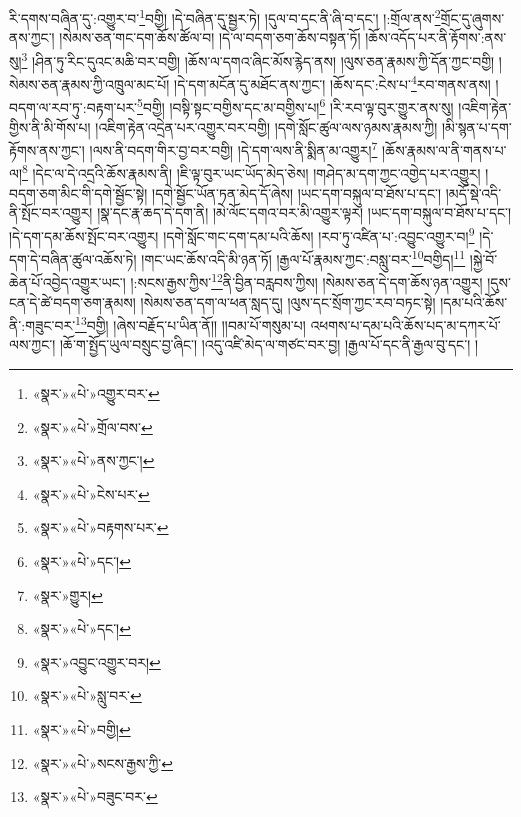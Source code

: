 རི་དགས་བཞིན་དུ་:འགྱུར་བ་\footnote{«སྣར་»«པེ་»འགྱུར་བར་}བགྱི། །དེ་བཞིན་དུ་སྦྱར་ཏེ། །དུལ་བ་དང་ནི་ཞི་བ་དང་། །:གྲོལ་ནས་\footnote{«སྣར་»«པེ་»གྲོལ་བས་}གྲོང་དུ་ཞུགས་ནས་ཀྱང་། །སེམས་ཅན་གང་དག་ཆོས་ཚོལ་བ། །དེ་ལ་བདག་ཅག་ཆོས་བསྟན་ཏོ། །ཆོས་འདོད་པར་ནི་རྟོགས་:ནས་སུ།\footnote{«སྣར་»«པེ་»ནས་ཀྱང་།} །ཤིན་ཏུ་རིང་དུའང་མཆི་བར་བགྱི། །ཆོས་ལ་དགའ་ཞིང་མོས་རྙེད་ནས། །ལུས་ཅན་རྣམས་ཀྱི་དོན་ཀྱང་བགྱི། །སེམས་ཅན་རྣམས་ཀྱི་འཁྲུལ་མང་པོ། །དེ་དག་མངོན་དུ་མཐོང་ནས་ཀྱང་། །ཆོས་དང་:ངེས་པ་\footnote{«སྣར་»«པེ་»ངེས་པར་}རབ་གནས་ནས། །བདག་ལ་རབ་ཏུ་:བརྟག་པར་\footnote{«སྣར་»«པེ་»བརྟགས་པར་}བགྱི། །བསྟི་སྟང་བགྱིས་དང་མ་བགྱིས་པ།\footnote{«སྣར་»«པེ་»དང་།} །རི་རབ་ལྟ་བུར་གྱུར་ནས་སུ། །འཇིག་རྟེན་གྱིས་ནི་མི་གོས་པ། །འཇིག་རྟེན་འདྲེན་པར་འགྱུར་བར་བགྱི། །དགེ་སློང་ཚུལ་ལས་ཉམས་རྣམས་ཀྱི། །མི་སྙན་པ་དག་རྟོགས་ནས་ཀྱང་། །ལས་ནི་བདག་གིར་བྱ་བར་བགྱི། །དེ་དག་ལས་ནི་སྨིན་མ་འགྱུར།\footnote{«སྣར་»གྱུར།} །ཆོས་རྣམས་ལ་ནི་གནས་པ་ལ།\footnote{«སྣར་»«པེ་»དང་།} །དེང་ལ་དེ་འདྲའི་ཆོས་རྣམས་ནི། །ཇི་ལྟ་བུར་ཡང་ཡོད་མེད་ཅེས། །གཤེད་མ་དག་ཀྱང་འགྱེད་པར་འགྱུར། །བདག་ཅག་མིང་གི་དགེ་སྦྱོང་སྟེ། །དགེ་སྦྱོང་ཡོན་ཏན་མེད་དོ་ཞེས། །ཡང་དག་བསྐུལ་བ་ཐོས་པ་དང་། །མདོ་སྡེ་འདི་ནི་སྤོང་བར་འགྱུར། །སྣ་དང་རྣ་ཆད་དེ་དག་ནི། །མེ་ལོང་དགའ་བར་མི་འགྱུར་ལྟར། །ཡང་དག་བསྐུལ་བ་ཐོས་པ་དང་། །དེ་དག་དམ་ཆོས་སྤོང་བར་འགྱུར། །དགེ་སློང་གང་དག་དམ་པའི་ཆོས། །རབ་ཏུ་འཛིན་པ་:འབྱུང་འགྱུར་བ།\footnote{«སྣར་»འབྱུང་འགྱུར་བར།} །དེ་དག་དེ་བཞིན་ཚུལ་འཆོས་ཏེ། །གང་ཡང་ཆོས་འདི་མི་ཉན་ཏོ། །རྒྱལ་པོ་རྣམས་ཀྱང་:བསླུ་བར་\footnote{«སྣར་»«པེ་»སླུ་བར་}བགྱིད།\footnote{«སྣར་»«པེ་»བགྱི།} །སྐྱེ་བོ་ཆེན་པོ་འབྱེད་འགྱུར་ཡང་། །:སངས་རྒྱས་ཀྱིས་\footnote{«སྣར་»«པེ་»སངས་རྒྱས་ཀྱི་}ནི་བྱིན་བརླབས་ཀྱིས། །སེམས་ཅན་དེ་དག་ཆོས་ཉན་འགྱུར། །དུས་ངན་དེ་ཚེ་བདག་ཅག་རྣམས། །སེམས་ཅན་དག་ལ་ཕན་སླད་དུ། །ལུས་དང་སྲོག་ཀྱང་རབ་བཏང་སྟེ། །དམ་པའི་ཆོས་ནི་:གཟུང་བར་\footnote{«སྣར་»«པེ་»བཟུང་བར་}བགྱི། །ཞེས་བརྗོད་པ་ཡིན་ནོ།། །།བམ་པོ་གསུམ་པ། འཕགས་པ་དམ་པའི་ཆོས་པད་མ་དཀར་པོ་ལས་ཀྱང་། །ཆོ་ག་སྤྱོད་ཡུལ་བསྲུང་བྱ་ཞིང་། །འདུ་འཛི་མེད་ལ་གཙང་བར་བྱ། །རྒྱལ་པོ་དང་ནི་རྒྱལ་བུ་དང་། །
